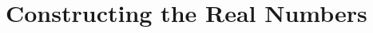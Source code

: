 \section{Constructing the Real Numbers}
\label{real}

\addtocounter{theorem}{5}

\begin{theorem} %
	\label{real:t:props}
	\TBD
\end{theorem}


\addtocounter{exercise}{2}
\Newpage
\begin{exercise} %
	\label{real:e:3}
	\TBD
\end{exercise}